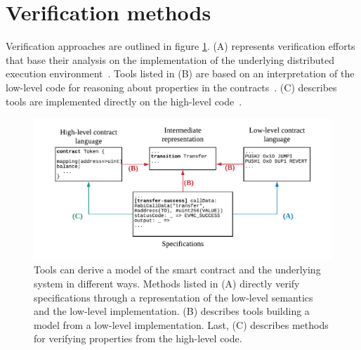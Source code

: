 \section{Verification methods}
\label{verification}


Verification approaches are outlined in figure \ref{fig:verification}. 
(A) represents verification efforts that base their analysis on the implementation of the underlying distributed execution environment~\cite{Hildenbrandt2017,Hirai2017,Bhargavan2016,Grishchenko2018}.
Tools listed in (B) are based on an interpretation of the low-level code for reasoning about properties in the contracts~\cite{Tsankov2017,Mueller2018,Luu2016,Albert2018,Grossman2017,Nikolic2018}. 
(C) describes tools are implemented directly on the high-level code~\cite{Reitwiessner2015Why3,Alt2018}. 


\begin{figure}[!t]
\normalsize
\centering
\includegraphics[width=\columnwidth]{fig/Verification.pdf}
\caption{Tools can derive a model of the smart contract and the underlying system in different ways. 
Methods listed in (A) directly verify specifications through a representation of the low-level semantics and the low-level implementation. (B) describes tools building a model from a low-level implementation. Last, (C) describes methods for verifying properties from the high-level code.}
\label{fig:verification}
\end{figure}

